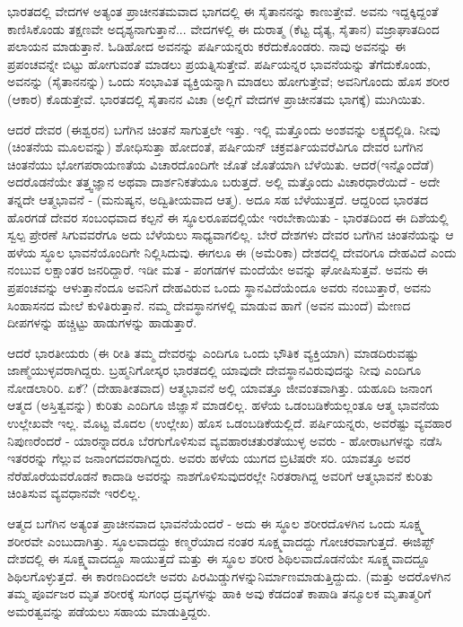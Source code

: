 ಭಾರತದಲ್ಲಿ ವೇದಗಳ ಅತ್ಯಂತ ಪ್ರಾಚೀನತಮವಾದ ಭಾಗದಲ್ಲಿ ಈ ಸೈತಾನನನ್ನು ಕಾಣುತ್ತೇವೆ. ಅವನು ಇದ್ದಕ್ಕಿದ್ದಂತೆ ಕಾಣಿಸಿಕೊಂಡು ತಕ್ಷಣವೇ ಅದೃಶ್ಯನಾಗುತ್ತಾನೆ... ವೇದಗಳಲ್ಲಿ ಈ ದುರಾತ್ಮ (ಕೆಟ್ಟ ದೈತ್ಯ, ಸೈತಾನ) ವಜ್ರಾಘಾತದಿಂದ ಪಲಾಯನ ಮಾಡುತ್ತಾನೆ. ಓಡಿಹೋದ ಅವನನ್ನು ಪರ್ಷಿಯನ್ನರು ಕರೆದುಕೊಂಡರು. ನಾವು ಅವನನ್ನು ಈ ಪ್ರಪಂಚವನ್ನೇ ಬಿಟ್ಟು ಹೋಗುವಂತೆ ಮಾಡಲು ಪ್ರಯತ್ನಿಸುತ್ತೇವೆ. ಪರ್ಷಿಯನ್ನರ ಭಾವನೆಯನ್ನು ತೆಗೆದುಕೊಂಡು, ಅವನನ್ನು (ಸೈತಾನನನ್ನು) ಒಂದು ಸಂಭಾವಿತ ವ್ಯಕ್ತಿಯನ್ನಾಗಿ ಮಾಡಲು ಹೋಗುತ್ತೇವೆ; ಅವನಿಗೊಂದು ಹೊಸ ಶರೀರ (ಆಕಾರ) ಕೊಡುತ್ತೇವೆ. ಭಾರತದಲ್ಲಿ ಸೈತಾನನ ವಿಚಾ (ಅಲ್ಲಿಗೆ ವೇದಗಳ ಪ್ರಾಚೀನತಮ ಭಾಗಕ್ಕೆ) ಮುಗಿಯಿತು.

ಆದರೆ ದೇವರ (ಈಶ್ವರನ) ಬಗೆಗಿನ ಚಿಂತನೆ ಸಾಗುತ್ತಲೇ ಇತ್ತು. ಇಲ್ಲಿ ಮತ್ತೊಂದು ಅಂಶವನ್ನು ಲಕ್ಷ್ಯದಲ್ಲಿಡಿ. ನೀವು (ಚಿಂತನೆಯ ಮೂಲವನ್ನು) ಶೋಧಿಸುತ್ತಾ ಹೋದಂತೆ, ಪರ್ಷಿಯನ್ ಚಕ್ರವರ್ತಿಯವರೆವಿಗೂ ದೇವರ ಬಗೆಗಿನ ಚಿಂತನೆಯು ಭೋಗ\break ಪರಾಯಣತೆಯ ವಿಚಾರದೊಂದಿಗೇ ಜೊತೆ ಜೊತೆಯಾಗಿ ಬೆಳೆಯಿತು. ಆದರೆ\break (ಇನ್ನೊಂದೆಡೆ) ಅದರೊಡನೆಯೇ ತತ್ತ್ವಜ್ಞಾನ ಅಥವಾ ದಾರ್ಶನಿಕತೆಯೂ ಬರುತ್ತದೆ. ಅಲ್ಲಿ ಮತ್ತೊಂದು ವಿಚಾರಧಾರೆಯಿದೆ - ಅದೇ ತನ್ನದೇ ಆತ್ಮಭಾವನೆ - (ಮನುಷ್ಯನ, ಅದ್ವಿತೀಯವಾದ ಆತ್ಮ). ಅದೂ ಸಹ ಬೆಳೆಯುತ್ತದೆ. ಆದ್ದರಿಂದ ಭಾರತದ ಹೊರಗಡೆ ದೇವರ ಸಂಬಂಧವಾದ ಕಲ್ಪನೆ ಈ ಸ್ಥೂಲರೂಪದಲ್ಲಿಯೇ ಇರಬೇಕಾಯಿತು - ಭಾರತದಿಂದ ಈ ದಿಶೆಯಲ್ಲಿ ಸ್ವಲ್ಪ ಪ್ರೇರಣೆ ಸಿಗುವವರೆಗೂ ಅದು ಬೆಳೆಯಲು ಸಾಧ್ಯವಾಗಲಿಲ್ಲ. ಬೇರೆ ದೇಶಗಳು ದೇವರ ಬಗೆಗಿನ ಚಿಂತನೆಯನ್ನು ಆ ಹಳೆಯ ಸ್ಥೂಲ ಭಾವನೆಯೊಂದಿಗೇ ನಿಲ್ಲಿಸಿದುವು. ಈಗಲೂ ಈ (ಅಮೆರಿಕಾ) ದೇಶದಲ್ಲಿ ದೇವರಿಗೂ ದೇಹವಿದೆ ಎಂದು ನಂಬುವ ಲಕ್ಷಾಂತರ ಜನರಿದ್ದಾರೆ. ಇಡೀ ಮತ - ಪಂಗಡಗಳ ಮಂದೆಯೇ ಅವನ್ನು ಘೋಷಿಸುತ್ತವೆ. ಅವನು ಈ ಪ್ರಪಂಚವನ್ನು ಆಳುತ್ತಾನೆಂದೂ ಅವನಿಗೆ ದೇಹವಿರುವ ಒಂದು ಸ್ಥಾನವಿದೆಯೆಂದೂ ಅವರು ನಂಬುತ್ತಾರೆ, ಅವನು ಸಿಂಹಾಸನದ ಮೇಲೆ ಕುಳಿತಿರುತ್ತಾನೆ. ನಮ್ಮ ದೇವಸ್ಥಾನಗಳಲ್ಲಿ ಮಾಡುವ ಹಾಗೆ (ಅವನ ಮುಂದೆ) ಮೇಣದ ದೀಪಗಳನ್ನು ಹಚ್ಚಿಟ್ಟು ಹಾಡುಗಳನ್ನು ಹಾಡುತ್ತಾರೆ.

ಆದರೆ ಭಾರತೀಯರು (ಈ ರೀತಿ ತಮ್ಮ ದೇವರನ್ನು ಎಂದಿಗೂ ಒಂದು ಭೌತಿಕ ವ್ಯಕ್ತಿಯಾಗಿ) ಮಾಡದಿರುವಷ್ಟು ಜಾಣ್ಮೆಯುಳ್ಳವರಾಗಿದ್ದರು. ಬ್ರಹ್ಮನಿಗೋಸ್ಕರ ಭಾರತದಲ್ಲಿ ಯಾವುದೇ ದೇವಸ್ಥಾನವಿರುವುದನ್ನು ನೀವು ಎಂದಿಗೂ ನೋಡಲಾರಿರಿ. ಏಕೆ? (ದೇಹಾತೀತವಾದ) ಆತ್ಮಭಾವನೆ ಅಲ್ಲಿ ಯಾವತ್ತೂ ಜೀವಂತವಾಗಿತ್ತು. ಯಹೂದಿ ಜನಾಂಗ ಆತ್ಮದ (ಅಸ್ತಿತ್ವವನ್ನು) ಕುರಿತು ಎಂದಿಗೂ ಜಿಜ್ಞಾಸೆ ಮಾಡಲಿಲ್ಲ. ಹಳೆಯ ಒಡಂಬಡಿಕೆಯಲ್ಲಂತೂ ಆತ್ಮ ಭಾವನೆಯ ಉಲ್ಲೇಖವೇ ಇಲ್ಲ. ಮೊಟ್ಟ ಮೊದಲ (ಉಲ್ಲೇಖ) ಹೊಸ ಒಡಂಬಡಿಕೆಯಲ್ಲಿದೆ. ಪರ್ಷಿಯನ್ನರು, ಅವರೆಷ್ಟು ವ್ಯವಹಾರ ನಿಪುಣರೆಂದರೆ - ಯಾರನ್ನಾದರೂ ಬೆರಗುಗೊಳಿಸುವ ವ್ಯವಹಾರಚತುರತೆಯುಳ್ಳ ಅವರು - ಹೋರಾಟಗಳನ್ನು ನಡೆಸಿ ಇತರರನ್ನು ಗೆಲ್ಲುವ ಜನಾಂಗದವರಾಗಿದ್ದರು. ಅವರು ಹಳೆಯ ಯುಗದ ಬ್ರಿಟಿಷರೇ ಸರಿ. ಯಾವತ್ತೂ ಅವರ ನೆರೆಹೊರೆಯವರೊಡನೆ ಕಾದಾಡಿ ಅವರನ್ನು ನಾಶಗೊಳಿಸುವುದರಲ್ಲೇ ನಿರತರಾಗಿದ್ದ ಅವರಿಗೆ ಆತ್ಮಭಾವನೆ ಕುರಿತು ಚಿಂತಿಸುವ ವ್ಯವಧಾನವೇ ಇರಲಿಲ್ಲ.

ಆತ್ಮದ ಬಗೆಗಿನ ಅತ್ಯಂತ ಪ್ರಾಚೀನವಾದ ಭಾವನೆಯೆಂದರೆ - ಅದು ಈ ಸ್ಥೂಲ ಶರೀರದೊಳಗಿನ ಒಂದು ಸೂಕ್ಷ್ಮ ಶರೀರವೇ ಎಂಬುದಾಗಿತ್ತು. ಸ್ಥೂಲವಾದದ್ದು ಕಣ್ಮರೆಯಾದ ನಂತರ ಸೂಕ್ಷ್ಮವಾದದ್ದು ಗೋಚರವಾಗುತ್ತದೆ. ಈಜಿಪ್ಟ್ ದೇಶದಲ್ಲಿ ಈ ಸೂಕ್ಷ್ಮವಾದದ್ದೂ ಸಾಯುತ್ತದೆ ಮತ್ತು ಈ ಸ್ಥೂಲ ಶರೀರ ಶಿಥಿಲವಾದೊಡನೆಯೇ ಸೂಕ್ಷ್ಮವಾದದ್ದೂ ಶಿಥಿಲಗೊಳ್ಳುತ್ತದೆ. ಈ ಕಾರಣದಿಂದಲೇ ಅವರು ಪಿರಮಿಡ್ಡುಗಳನ್ನು\break ನಿರ್ಮಾಣಮಾಡುತ್ತಿದ್ದುದು. (ಮತ್ತು ಅದರೊಳಗಿನ ತಮ್ಮ ಪೂರ್ವಜರ ಮೃತ ಶರೀರಕ್ಕೆ ಸುಗಂಧ ದ್ರವ್ಯಗಳನ್ನು ಹಾಕಿ ಅವು ಕೆಡದಂತೆ ಕಾಪಾಡಿ ತನ್ಮೂಲಕ ಮೃತಾತ್ಮರಿಗೆ ಅಮರತ್ವವನ್ನು ಪಡೆಯಲು ಸಹಾಯ ಮಾಡುತ್ತಿದ್ದರು.

